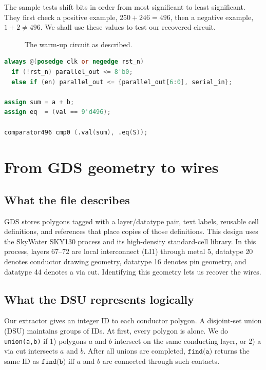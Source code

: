\documentclass[11pt]{article}
\newcommand{\fitwidth}[1]{\resizebox{\ifdim\width>\linewidth\linewidth\else\width\fi}{!}{#1}}
\begin{document}
The sample tests shift bits in order from most significant to least significant. They first check a positive example, $250+246=496$, then a negative example, $1+2\neq496$. We shall use these values to test our recovered circuit.

\begin{figure}[H]
  \centering
  \fitwidth{}
  \caption{The warm-up circuit as described.}
  \label{fig:warmup-design}
\end{figure}

\begin{lstlisting}[language=Verilog,caption={The warm-up behavior, abridged from its published source.}]
always @(posedge clk or negedge rst_n)
  if (!rst_n) parallel_out <= 8'b0;
  else if (en) parallel_out <= {parallel_out[6:0], serial_in};

assign sum = a + b;
assign eq  = (val == 9'd496);

comparator496 cmp0 (.val(sum), .eq(S));
\end{lstlisting}

\section{From GDS geometry to wires}

\subsection{What the file describes}

GDS stores polygons tagged with a layer/datatype pair, text labels, reusable cell definitions, and references that place copies of those definitions. This design uses the SkyWater SKY130 process and its high-density standard-cell library. In this process, layers 67--72 are local interconnect (LI1) through metal 5, datatype 20 denotes conductor drawing geometry, datatype 16 denotes pin geometry, and datatype 44 denotes a via cut. Identifying this geometry lets us recover the wires.

\subsection{What the DSU represents logically}

Our extractor gives an integer ID to each conductor polygon. A disjoint-set union (DSU) maintains groups of IDs. At first, every polygon is alone. We do \texttt{union(a,b)} if 1) polygons $a$ and $b$ intersect on the same conducting layer, or 2) a via cut intersects $a$ and $b$. After all unions are completed, $\texttt{find(a)}$ returns the same ID as $\texttt{find(b)}$ iff $a$ and $b$ are connected through such contacts.
\end{document}
